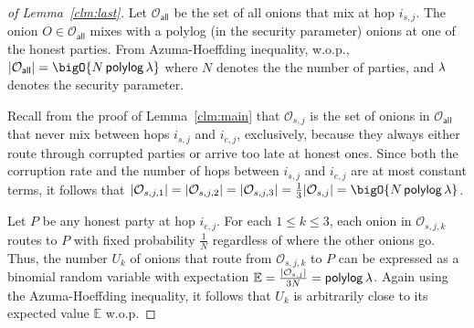 \documentclass[runningheads,a4paper]{llncs}
\begin{document}
\begin{proof}[of Lemma~\ref{clm:last}] 
Let $\mathcal{O}_{\mathsf{all}}$ be the set of all onions that mix at hop $i_{s, j}$. 
The onion $O \in \mathcal{O}_{\mathsf{all}}$ mixes with a polylog (in the security parameter) onions at one of the honest parties. 
From Azuma-Hoeffding inequality, w.o.p.,  $|\mathcal{O}_{\mathsf{all}}| = \bigO{N \thinspace \polylog\thinspace \secpar}$ where $N$ denotes the the number of parties, and $\lambda$ denotes the security parameter. 

Recall from the proof of Lemma~\ref{clm:main} that $\mathcal{O}_{s, j}$ is the set of onions in $\mathcal{O}_{\mathsf{all}}$ that never mix between hops $i_{s,j}$ and $i_{e,j}$, exclusively, because they always either route through corrupted parties or arrive too late at honest ones. 
Since both the corruption rate and the number of hops between $i_{s,j}$ and $i_{e,j}$ are at most constant terms, it follows that $|\mathcal{O}_{s,j,1}| = |\mathcal{O}_{s,j,2}| = |\mathcal{O}_{s,j,3}| = \frac{1}{3}|\mathcal{O}_{s,j}| = \bigO{N \thinspace \polylog \thinspace \secpar}$. 

Let $P$ be any honest party at hop $i_{e, j}$. 
For each $1 \le k \le 3$, each onion in $\mathcal{O}_{s, j, k}$ routes to $P$ with fixed probability $\frac{1}{N}$ regardless of where the other onions go. Thus, the number $U_k$ of onions that route from $\mathcal{O}_{s, j, k}$ to $P$ can be expressed as a binomial random variable %
with expectation $\mathbb{E} = \frac{|\mathcal{O}_{s,j}|}{3N} = \mathsf{polylog} \thinspace \lambda$. Again using the Azuma-Hoeffding inequality, it follows that $U_k$ is arbitrarily close to its expected value $\mathbb{E}$ w.o.p. 
\end{proof}
\end{document}
